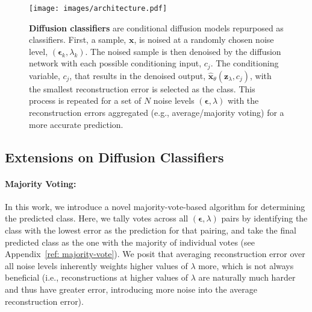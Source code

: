 \begin{figure}[h]
    \centering
    \texttt{[image: images/architecture.pdf]}
    \caption{\textbf{Diffusion classifiers} are conditional diffusion models repurposed as classifiers. First, a sample, $\bm{x}$, is noised at a randomly chosen noise level, $(\bm{\epsilon}_k, \lambda_k)$. The noised sample is then denoised by the diffusion network with each possible conditioning input, $c_j$. The conditioning variable, $c_j$, that results in the denoised output, $\hat{\bm{x}}_\theta (\bm{z}_\lambda, c_j)$, with the smallest reconstruction error is selected as the class. This process is repeated for a set of $N$ noise levels $(\bm{\epsilon}, \lambda)$ with the reconstruction errors aggregated (e.g., average/majority voting) for a more accurate prediction.}
    \label{fig:architecture}
\end{figure}

\subsection{Extensions on Diffusion Classifiers} 
\label{extensions}

\paragraph{Majority Voting:} \label{majority-voting} In this work, we introduce a novel  majority-vote-based algorithm for determining the predicted class. Here, we tally votes across all $(\bm{\epsilon}, \lambda)$ pairs by identifying the class with the lowest error as the prediction for that pairing, and take the final predicted class as the one with the majority of individual votes (see Appendix~\ref{ref: majority-vote}). We posit that averaging reconstruction error over all noise levels inherently weights higher values of $\lambda$ more, which is not always beneficial (i.e., reconstructions at higher values of $\lambda$ are naturally much harder and thus have greater error, introducing more noise into the average reconstruction error). %

